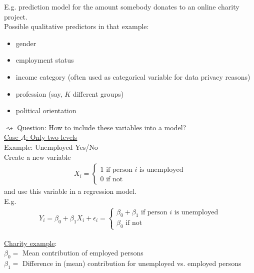 \documentclass[11pt,a4paper,numbers=endperiod]{scrartcl}
\newcommand{\id}{\hspace*{4mm}}
\begin{document}
{E.g. prediction model for the amount somebody donates to an online charity project.\\
Possible qualitative predictors in that example: \begin{itemize}
	\item gender
	\item employment status
	\item income category (often used as categorical variable for data privacy reasons)
	\item profession (say, $K$ different groups) 
	\item political orientation
\end{itemize}
$\rightsquigarrow$ Question: How to include these variables into a model?\\

\underline{Case $A$: Only two levels}\\

Example: Unemployed Yes/No \\
Create a new variable \begin{align*}
	X_i = \begin{cases}
	1 \text{ if person $i$ is unemployed}\\
	0 \text{ if not} 
	\end{cases}
\end{align*}
and use this variable in a regression model.\\
E.g. \begin{align*}
	Y_i = \beta_0 + \beta_1 X_i + \epsilon_i = \begin{cases}
	\beta_0 + \beta_1 \text{ if person $i$ is unemployed}\\
	\beta_0 \text{ if not}
	\end{cases}
\end{align*}

\underline{Charity example}:\\
\id $\beta_0 =$ Mean contribution of employed persons\\
\id $\beta_1 =$ Difference in (mean) contribution for unemployed vs. employed persons\\

}
\end{document}
